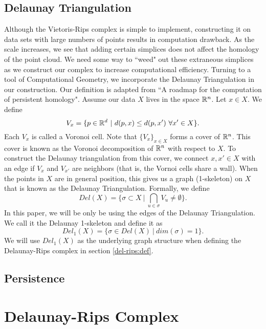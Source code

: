 \documentclass[letterpaper,titlepage]{article}
\begin{document}
\subsection{Delaunay Triangulation}
Although the Vietoris-Rips complex is simple to implement, constructing it on data sets with large numbers of points results in computation drawback. As the scale increases, we see that adding certain simplices does not affect the homology of the point cloud. We need some way to ``weed" out these extraneous simplices as we construct our complex to increase computational efficiency. Turning to a tool of Computational Geometry, we incorporate the Delaunay Triangulation in our construction. Our definition is adapted from ``A roadmap for the computation of persistent homology"\cite{roadmap}. Assume our data $X$ lives in the space $\mathbb{R}^n$. Let $x \in X$. We define
$$V_x = \{p \in \mathbb{R}^d\ |\ d(p,x) \leq d(p, x')\ \forall x' \in X\}.$$
Each $V_x$ is called a Voronoi cell. Note that $\{V_x\}_{x \in X}$ forms a cover of $\mathbb{R}^n$. This cover is known as the Voronoi decomposition of $\mathbb{R}^n$ with respect to $X$. To construct the Delaunay triangulation from this cover, we connect $x,x' \in X$ with an edge if $V_x$ and $V_{x'}$ are neighbors (that is, the Vornoi cells share a wall). When the points in $X$ are in general position, this gives us a graph (1-skeleton) on $X$ that is known as the Delaunay Triangulation. Formally, we define \cite{edelsbrunner}
$$Del(X) = \{\sigma \subset X\ |\ \bigcap_{u \in \sigma} V_u \neq \emptyset\}.$$
In this paper, we will be only be using the edges of the Delaunay Triangulation. We call it the Delaunay 1-skeleton and define it as
$$Del_{1}(X) = \{\sigma \in Del(X)\ |\ dim(\sigma) = 1\}.$$
We will use $Del_1(X)$ as the underlying graph structure when defining the Delaunay-Rips complex in section \ref{del-rips:def}.

\subsection{Persistence}


\section{Delaunay-Rips Complex}
\end{document}
